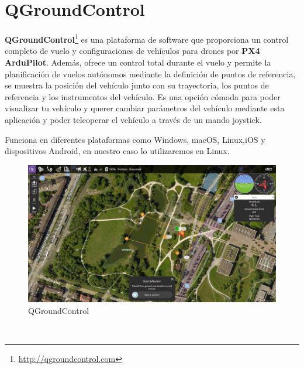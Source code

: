 \section{QGroundControl}
\label{sec:QGroundControl} 

\textbf{QGroundControl}\footnote{\url{http://qgroundcontrol.com}} es una plataforma de software que proporciona un control completo de vuelo 
y configuraciones de vehículos para drones por \textbf{PX4 ArduPilot}. Además, ofrece un control total durante el vuelo y permite la planificación de vuelos autónomos 
mediante la definición de puntos de referencia, se muestra la posición del vehículo junto con su trayectoria, los puntos de referencia y los instrumentos del vehículo. 
Es una opción cómoda para poder visualizar tu vehículo y querer cambiar parámetros del vehículo mediante esta aplicación y poder teleoperar el vehículo a través de un mando joystick. \newline

Funciona en diferentes plataformas como Windows, macOS, Linux,iOS y dispositivos Android, en nuestro caso lo utilizaremos en Linux. 

\begin{figure} [h]
  \begin{center}
    \includegraphics[scale=1.2]{figs/Plataformas_Desarollo/software-qgc.jpg}
  \end{center}
  \caption{QGroundControl}
  \label{fig:QGroundControl}
\end{figure}\


































